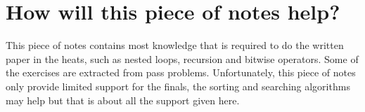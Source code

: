 \section{How will this piece of notes help?}

This piece of notes contains most knowledge that is required to do the written paper in the heats, such as nested loops, recursion and bitwise operators. Some of the exercises are extracted from pass problems. Unfortunately, this piece of notes only provide limited support for the finals, the sorting and searching algorithms may help but that is about all the support given here.